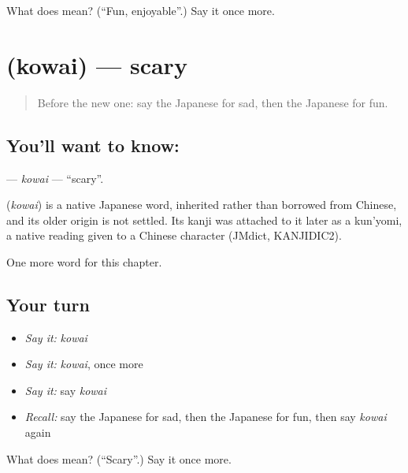 \begin{tcolorbox}[breakable,colback=teal!4,colframe=teal!35!black,title={Before you move on}]
What does  mean? (\textquotedblleft{}Fun, enjoyable\textquotedblright{}.) Say it once more.
\end{tcolorbox}
\section[\texorpdfstring{\ja{こわい} (kowai)}{こわい (kowai)}]{ (kowai) — scary}

\label{lesson:JA-C23-kowai}



\begin{quote}
Before the new one: say the Japanese for sad, then the Japanese for fun.
\end{quote}

\subsection*{You'll want to know: }
\textbf{} — \emph{kowai} — \textquotedblleft{}scary\textquotedblright{}.

\begin{cousinweb}
\textbf{} (\emph{kowai}) is a native Japanese word, inherited rather than borrowed from Chinese, and its older origin is not settled. Its kanji was attached to it later as a kun'yomi, a native reading given to a Chinese character (JMdict, KANJIDIC2).
\end{cousinweb}

\begin{grammarlens}[title={What you've built}]
One more word for this chapter.
\end{grammarlens}

\subsection*{Your turn}
\begin{itemize}
\raggedright
  \item \emph{Say it:} \emph{kowai}
  \item \emph{Say it:} \emph{kowai}, once more
  \item \emph{Say it:} say \emph{kowai}
  \item \emph{Recall:} say the Japanese for sad, then the Japanese for fun, then say \emph{kowai} again
\end{itemize}

\begin{tcolorbox}[breakable,colback=teal!4,colframe=teal!35!black,title={Before you move on}]
What does  mean? (\textquotedblleft{}Scary\textquotedblright{}.) Say it once more.
\end{tcolorbox}
